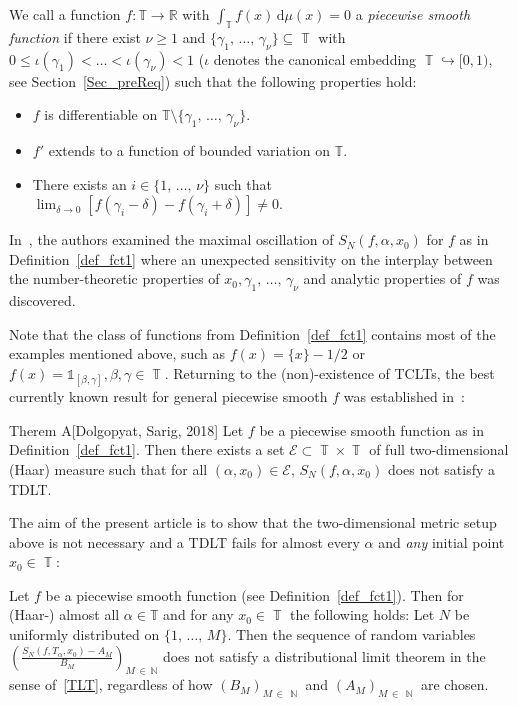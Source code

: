 \documentclass[AHL,Unicode,longabstracts,published]{cedram}
\DeclareMathOperator{\N}{\mathbb{N}}
\DeclareMathOperator{\T}{\mathbb{T}}
\newcommand{\bbN}{\mathbb{N}}
\newcommand{\bbT}{\mathbb{T}}
\newcommand{\bbR}{\mathbb{R}}
\newcommand{\rmd}{\mathrm{d}}
\newcommand{\clE}{\mathcal{E}}
\newcommand{\bbT}{\mathbb{T}}
\newcommand{\bbR}{\mathbb{R}}
\begin{document}
\begin{defi}\label{def_fct1}
We call a function $f: \bbT \to \bbR$ with $\int_{\bbT} f(x)\,\rmd  \mu(x) = 0$ a \emph{piecewise smooth function} if there exist $ \nu \geq 1$ and $ \{\gamma_1,\,\ldots,\,\gamma_\nu \} \subseteq \T$ with $ 0 \leq \iota(\gamma_1) < \ldots < \iota(\gamma_{ \nu}) < 1$ ($\iota$ denotes the canonical embedding $\T \hookrightarrow [0,1)$, see Section~\ref{Sec_preReq}) such that the following properties hold:
\begin{itemize}
\item $f$ is differentiable on $\bbT\setminus \{\gamma_1,\,\ldots,\,\gamma_{\nu}\}$.
\item $f'$ extends to a function of bounded variation on $\bbT$.
\item There exists an $i \in \{1,\,\ldots,\,\nu\}$ such that $\lim_{ \delta \rightarrow 0} [f(\gamma_i - \delta) - f(\gamma_i+ \delta)] \neq 0$.
\end{itemize}
\end{defi}

In~\cite{upper_dens}, the authors examined the maximal oscillation of $S_N(f,\alpha,x_0)$ for $f$ as in Definition~\ref{def_fct1} where an unexpected sensitivity on the interplay between the number-theoretic properties of $x_0,\gamma_1,\,\ldots,\,\gamma_\nu$ and analytic properties of $f$ was discovered.

\noindent Note that the class of functions from Definition~\ref{def_fct1} contains most of the examples mentioned above, such as $f(x) = \{x\} - 1/2$ or $f(x) = \mathds{1}_{[\beta,\gamma]}, \beta,\gamma \in \T$. Returning to the (non)-existence of TCLTs, the best currently known result for general piecewise smooth $f$ was established in~\cite{dol_sar_no}:

\begin{enonce*}{Therem A}[Dolgopyat, Sarig, 2018]
Let $f$ be a piecewise smooth function as in Definition~\ref{def_fct1}. Then there exists a set $\clE \subset \T \times \T$ of full two-dimensional (Haar) measure such that for all $(\alpha,x_0) \in \clE$, $S_N(f,\alpha,x_0)$ does not satisfy a TDLT.
\end{enonce*}

The aim of the present article is to show that the two-dimensional metric setup above is not necessary and a TDLT fails for almost every $\alpha$ and \emph{any} initial point $x_0 \in \T$:

\begin{theo}\label{thm_no_LT}
Let $f$ be a piecewise smooth function (see Definition~\ref{def_fct1}). Then for (Haar-) almost all $ \alpha \in \bbT$ and for any $x_0 \in \T$ the following holds: Let $N$ be uniformly distributed on $\{1,\,\ldots,\,M\}$. Then the sequence of random variables $(\frac{S_{N}(f,T_{\alpha},x_0) - A_M}{B_M})_{M\,\in\,\bbN}$ does not satisfy a distributional limit theorem in the sense of~\eqref{TLT}, regardless of how $(B_M)_{M\,\in\,\N}$ and $(A_M)_{M\,\in\,\N}$ are chosen.
\end{theo}
\end{document}
